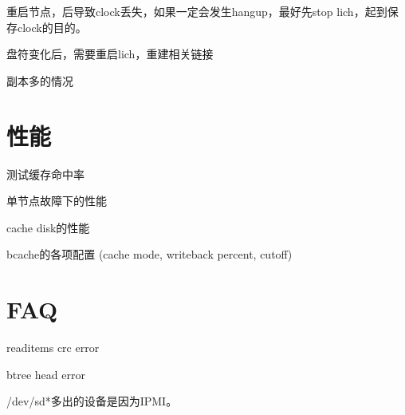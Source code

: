 重启节点，后导致clock丢失，如果一定会发生hangup，最好先stop lich，起到保存clock的目的。

盘符变化后，需要重启lich，重建相关链接

副本多的情况

\section{性能}

测试缓存命中率

单节点故障下的性能
\begin{enumbox}
\item cache disk的性能
\item bcache的各项配置 (cache mode, writeback percent, cutoff)
\end{enumbox}

\section{FAQ}

readitems crc error

btree head error

/dev/sd*多出的设备是因为IPMI。
